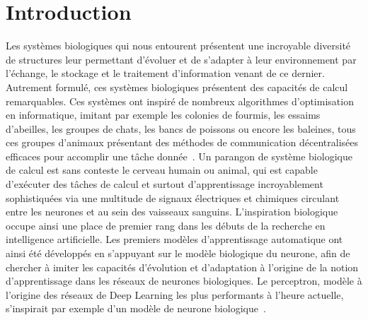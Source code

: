 \chapter*{Introduction}

Les systèmes biologiques qui nous entourent présentent une incroyable diversité de structures leur permettant d'évoluer et de s'adapter à leur environnement par l'échange, le stockage et le traitement d'information venant de ce dernier.
Autrement formulé, ces systèmes biologiques présentent des capacités de calcul remarquables. 
Ces systèmes ont inspiré de nombreux algorithmes d'optimisation en informatique, imitant par exemple les colonies de fourmis, les essaims d'abeilles, les groupes de chats, les bancs de poissons ou encore les baleines, tous ces groupes d'animaux présentant des méthodes de communication décentralisées efficaces pour accomplir une tâche donnée~\parencite{Darwish2018BioinspiredCA,nature_inspired_2020}.
Un parangon de système biologique de calcul est sans conteste le cerveau humain ou animal, qui est capable d'exécuter des tâches de calcul et surtout d'apprentissage incroyablement sophistiquées via une multitude de signaux électriques et chimiques circulant entre les neurones et au sein des vaisseaux sanguins.
L'inspiration biologique occupe ainsi une place de premier rang dans les débuts de la recherche en intelligence artificielle.
Les premiers modèles d'apprentissage automatique ont ainsi été développés en s'appuyant sur le modèle biologique du neurone, afin de chercher à imiter les capacités d'évolution et d'adaptation à l'origine de la notion d'apprentissage dans les réseaux de neurones biologiques. Le perceptron, modèle à l'origine des réseaux de Deep Learning les plus performants à l'heure actuelle, s'inspirait par exemple d'un modèle de neurone biologique~\parencite{McCulloch1990ALC}.
